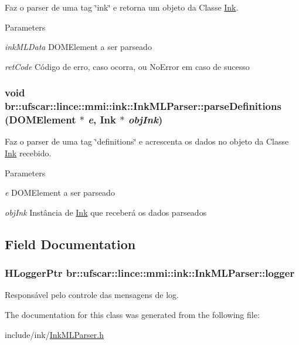 Faz o parser de uma tag \char`\"{}ink\char`\"{} e retorna um objeto da Classe \hyperlink{classbr_1_1ufscar_1_1lince_1_1mmi_1_1ink_1_1Ink}{Ink}. 


\begin{DoxyParams}{Parameters}
\item[{\em inkMLData}]DOMElement a ser parseado \item[{\em retCode}]Código de erro, caso ocorra, ou NoError em caso de sucesso \end{DoxyParams}
\hypertarget{classbr_1_1ufscar_1_1lince_1_1mmi_1_1ink_1_1InkMLParser_afa63df2f41822c11e28762f3c17b1b43}{
\subsubsection[{parseDefinitions}]{\setlength{\rightskip}{0pt plus 5cm}void br::ufscar::lince::mmi::ink::InkMLParser::parseDefinitions (DOMElement $\ast$ {\em e}, \/  {\bf Ink} $\ast$ {\em objInk})}}
\label{classbr_1_1ufscar_1_1lince_1_1mmi_1_1ink_1_1InkMLParser_afa63df2f41822c11e28762f3c17b1b43}


Faz o parser de uma tag \char`\"{}definitions\char`\"{} e acrescenta os dados no objeto da Classe \hyperlink{classbr_1_1ufscar_1_1lince_1_1mmi_1_1ink_1_1Ink}{Ink} recebido. 


\begin{DoxyParams}{Parameters}
\item[{\em e}]DOMElement a ser parseado \item[{\em objInk}]Instância de \hyperlink{classbr_1_1ufscar_1_1lince_1_1mmi_1_1ink_1_1Ink}{Ink} que receberá os dados parseados \end{DoxyParams}


\subsection{Field Documentation}
\hypertarget{classbr_1_1ufscar_1_1lince_1_1mmi_1_1ink_1_1InkMLParser_aab8a422c5f6b431865f0b848b96f5e35}{
\subsubsection[{logger}]{\setlength{\rightskip}{0pt plus 5cm}HLoggerPtr {\bf br::ufscar::lince::mmi::ink::InkMLParser::logger}}}
\label{classbr_1_1ufscar_1_1lince_1_1mmi_1_1ink_1_1InkMLParser_aab8a422c5f6b431865f0b848b96f5e35}


Responsável pelo controle das mensagens de log. 



The documentation for this class was generated from the following file:\begin{DoxyCompactItemize}
\item 
include/ink/\hyperlink{InkMLParser_8h}{InkMLParser.h}\end{DoxyCompactItemize}
